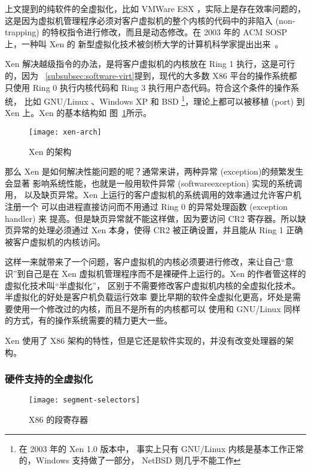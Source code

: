上文提到的纯软件的全虚拟化，比如 VMWare ESX ，实际上是存在效率问题的，
这是因为虚拟机管理程序必须对客户虚拟机的整个内核的代码中的非陷入 (non-trapping)
的特权指令进行修改，而且是动态修改。在 2003 年的 ACM SOSP 上，一种叫 Xen 的
新型虚拟化技术被剑桥大学的计算机科学家提出出来~\cite{barham2003xen}。

Xen 解决越级指令的办法，是将客户虚拟机的内核放在 Ring 1 执行，这是可行的，因为
~\ref{subsubsec:software-virt}提到，现代的大多数 X86 平台的操作系统都
只使用 Ring 0 执行内核代码和 Ring 3 执行用户态代码。符合这个条件的操作系统，
比如 GNU/Linux 、Windows XP 和 BSD \footnote{在 2003 年的 Xen 1.0 版本中，
事实上只有 GNU/Linux 内核是基本工作正常的，Windows 支持做了一部分，
NetBSD 则几乎不能工作}，理论上都可以被移植 (port) 到 Xen 上。Xen 的基本结构如
图~\ref{fig:xen-arch}所示。

\begin{figure}[h]
    \centering
    \texttt{[image: xen-arch]}
    \caption{Xen 的架构}
    \label{fig:xen-arch}
\end{figure}

那么 Xen 是如何解决性能问题的呢？通常来讲，两种异常 (exception)的频繁发生会显著
影响系统性能，也就是一般用软件异常 (softwareexception) 实现的系统调用，
以及缺页异常。Xen 上运行的客户虚拟机的系统调用的效率通过允许客户机注册一个
可以由进程直接访问而不用通过 Ring 0 的异常处理函数 (exception handler) 来
提高。但是缺页异常就不能这样做，因为要访问 CR2 寄存器。所以缺页异常的处理必须通过
Xen 本身，使得 CR2 被正确设置，并且能从 Ring 1 正确被客户虚拟机的内核访问。

这样一来就带来了一个问题，客户虚拟机的内核必须要进行修改，来让自己“意识”到自己是在
Xen 虚拟机管理程序而不是裸硬件上运行的。Xen 的作者管这样的虚拟化技术叫“半虚拟化”，
区别于不需要修改客户虚拟机内核的全虚拟化技术。半虚拟化的好处是客户机负载运行效率
要比早期的软件全虚拟化更高，坏处是需要使用一个修改过的内核，而且不是所有的内核都可以
使用和 GNU/Linux 同样的方式，有的操作系统需要的精力更大一些。

Xen 使用了 X86 架构的特性，但是它还是软件实现的，并没有改变处理器的架构。

\subsubsection{硬件支持的全虚拟化}
\label{subsubsec:hardware-virt}

\begin{figure}[h]
    \centering
    \texttt{[image: segment-selectors]}
    \caption{X86 的段寄存器}
    \label{fig:segment-selectors}
\end{figure}

